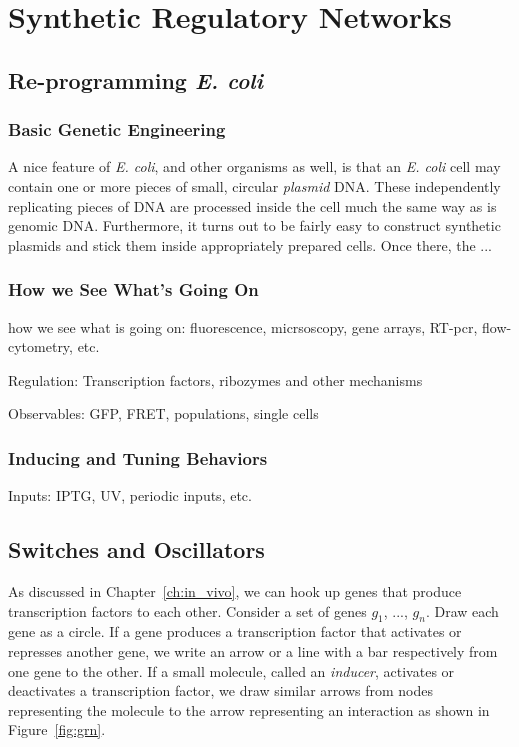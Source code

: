 \chapter{Synthetic Regulatory Networks} 

\section{Re-programming {\em E. coli}}


\subsection{Basic Genetic Engineering}

A nice feature of {\em E. coli}, and other organisms as well, is that
an {\em E. coli} cell may contain one or more pieces of small,
circular {\em plasmid} DNA. These independently replicating pieces of
DNA are processed inside the cell much the same way as is genomic
DNA. Furthermore, it turns out to be fairly easy to construct
synthetic plasmids and stick them inside appropriately prepared
cells. Once there, the ...

\subsection{How we See What's Going On}

how we see what is going on: fluorescence, micrsoscopy, gene arrays,
RT-pcr, flow-cytometry, etc. 

Regulation: Transcription factors, ribozymes and other mechanisms

Observables: GFP, FRET, populations, single cells

\subsection{Inducing and Tuning Behaviors}

Inputs: IPTG, UV, periodic inputs, etc.


\section{Switches and Oscillators}

As discussed in Chapter~\ref{ch:in_vivo}, we can hook up genes that
produce transcription factors to each other. Consider a set of genes
$g_1$, ..., $g_n$. Draw each gene as a circle. If a gene produces a
transcription factor that activates or represses another gene, we
write an arrow or a line with a bar respectively from one gene to the
other. If a small molecule, called an {\em inducer}, activates or
deactivates a transcription factor, we draw similar arrows from nodes
representing the molecule to the arrow representing an
interaction as shown in Figure~\ref{fig:grn}. 

